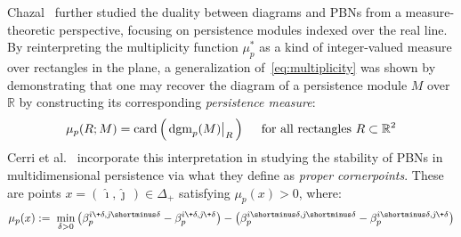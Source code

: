 Chazal~\cite{chazal2016structure} further studied the duality between diagrams and PBNs from a measure-theoretic perspective, focusing on persistence modules indexed over the real line. 
By reinterpreting the multiplicity function $\mu^\ast_p$ as a kind of integer-valued measure over rectangles in the plane, a generalization of~\eqref{eq:multiplicity} 
was shown by demonstrating that one may recover the diagram of a persistence module $M$ over $\mathbb{R}$ by constructing its corresponding \emph{persistence measure}:
\begin{equation}\label{eq:measure}
	\mu_p(R; M) = \mathrm{card}\left( \,
	\restr{\mathrm{dgm}_p(M)}{R} \,
	\right) \quad \text{ for all rectangles } R \subset \mathbb{R}^2 
\end{equation}
Cerri et al.~\cite{cerri2013betti} incorporate this interpretation in studying the stability of PBNs in multidimensional persistence via what they define as \emph{proper cornerpoints}. These are points $x = (\, \hat\imath, \hat\jmath \,) \in \Delta_+$ satisfying $\mu_p(x) > 0$, where:
\begin{equation}\label{eq:pbn_cont}
\mu_p(x) := \; \min_{\delta > 0} \left(\beta_p^{\hat\imath \+ \delta, \hat\jmath  \shortminus \delta} - \beta_p^{\hat\imath \+ \delta, \hat\jmath  \+ \delta} \right) - \left(\beta_p^{\hat\imath \shortminus \delta, \hat\jmath \shortminus \delta} - \beta_p^{\hat\imath \shortminus \delta, \hat\jmath  \+ \delta} \right)
\end{equation}
